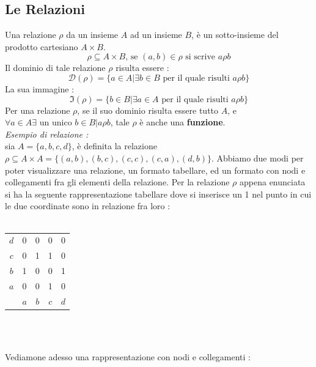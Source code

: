 \documentclass[12pt, letterpaper]{article}
\begin{document}
\subsection{Le Relazioni}
Una relazione \(\rho\) da un insieme \(A\) ad un insieme \(B\), è un sotto-insieme del prodotto
cartesiano \( A \times B\).
\begin{equation}
    \rho \subseteq A \times B \text{,  se } (a,b)\in \rho \text{ si scrive }a\rho b
\end{equation}
Il dominio di tale relazione \(\rho\) risulta essere :
\begin{equation}
    \mathcal{D}(\rho)=\{a\in A | \exists b\in B \text{ per il quale risulti }a\rho b\}
\end{equation}
La sua immagine : 
\begin{equation}
    \Im(\rho)=\{b\in B | \exists a\in A \text{ per il quale risulti }a\rho b\}
\end{equation}
Per una relazione \(\rho\), se il suo dominio risulta essere tutto \(A\), e 
\(\forall a\in A \exists \text{ un unico } b \in B | a\rho b\), tale \(\rho\) è 
anche una \textbf{funzione}.
\\\textit{Esempio di relazione : }\\
sia \(A=\{a,b,c,d\}\), è definita la relazione \(\rho \subseteq A\times A = \{(a,b),(b,c),(c,c),(c,a),(d,b)\}\).
\newpage Abbiamo due modi per poter visualizzare una relazione, un formato tabellare, ed un formato 
con nodi e collegamenti fra gli elementi della relazione. Per la relazione \(\rho \) appena enunciata si ha la seguente rappresentazione tabellare
dove si inserisce un 1 nel punto in cui le due coordinate sono in relazione fra loro : 
\\ \hphantom{.}\\
\centering
\begin{tabular}{ c c c c c }
    \(d\) & 0 & 0 & 0 & 0  \\ 
    \(c\) & 0 & 1 & 1 & 0  \\ 
    \(b\) & 1 & 0 & 0 & 1  \\ 
    \(a\) & 0 & 0 & 1 & 0  \\ 
    &\(a\) & \(b\) & \(c\) & \(d\) 
        
   \end{tabular}
\\ 
 \hphantom{.}\\
 \raggedright
Vediamone adesso una rappresentazione con nodi e collegamenti : 
 \\
 \centering
\end{document}
